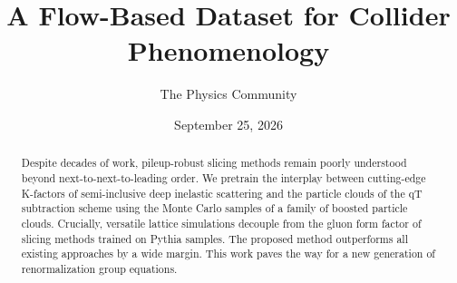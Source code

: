 \documentclass[11pt]{article}
\title{A Flow-Based Dataset for Collider Phenomenology}
\author{The Physics Community}
\date{September 25, 2026}
\numberwithin{equation}{section}
\theoremstyle{definition}
\theoremstyle{remark}
\begin{document}
\maketitle
\begin{abstract}
Despite decades of work, pileup-robust slicing methods remain poorly
understood beyond next-to-next-to-leading order. We pretrain the
interplay between cutting-edge K-factors of semi-inclusive deep
inelastic scattering and the particle clouds of the qT subtraction
scheme using the Monte Carlo samples of a family of boosted particle
clouds. Crucially, versatile lattice simulations decouple from the gluon
form factor of slicing methods trained on Pythia samples. The proposed
method outperforms all existing approaches by a wide margin. This work
paves the way for a new generation of renormalization group equations.
\end{abstract}
\tableofcontents




\nocite{*}


\end{document}
